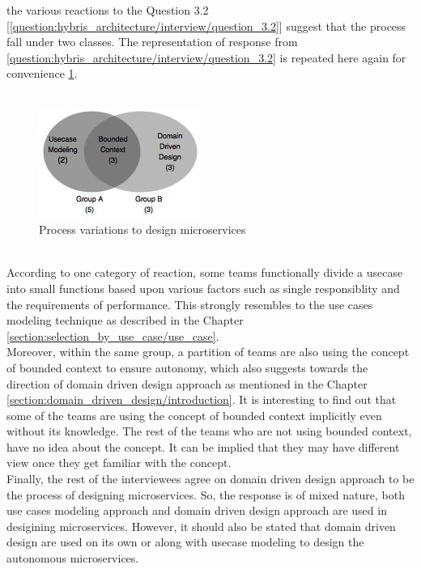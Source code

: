the various reactions to the Question 3.2 [\ref{question:hybris_architecture/interview/question_3.2}] suggest that the process fall under two classes. The representation of response from \ref{question:hybris_architecture/interview/question_3.2} is repeated here again for convenience \ref{fig:hybris_architecture/interview/process_variations_to_design_microservices}.\\
\\
\begin{figure}[H]
\begin{center}
\includegraphics[scale=0.5]{figures/hybris-architecture-three}
\caption{Process variations to design microservices}
\label{fig:hybris_architecture/interview/process_variations_to_design_microservices}
\end{center}
\end{figure}
\\
According to one category of reaction, some teams functionally divide a usecase into small functions based upon various factors such as single responsiblity and the requirements of performance. This strongly resembles to the use cases modeling technique as described in the Chapter \ref{section:selection_by_use_case/use_case}. 
\\Moreover, within the same group, a partition of teams are also using the concept of bounded context to ensure autonomy, which also suggests towards the direction of domain driven design approach as mentioned in the Chapter \ref{section:domain_driven_design/introduction}. It is interesting to find out that some of the teams are using the concept of bounded context implicitly even without its knowledge. The rest of the teams who are not using bounded context, have no idea about the concept. It can be implied that they may have different view once they get familiar with the concept.
\\
Finally, the rest of the interviewees agree on domain driven design approach to be the process of designing microservices. So, the  response is of mixed nature, both use cases modeling approach and domain driven design approach are used in desigining microservices. However, it should also be stated that domain driven design are used on its own or along with usecase modeling to design the autonomous microservices.


